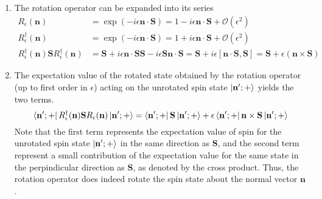 \begin{sol}
        \begin{enumerate}[label=\textbf{(\alph*)}]
            \item
            The rotation operator can be expanded into its series
            \begin{align}
                R_\epsilon(\mathbf{n})&=\exp\left(- i\epsilon\mathbf{n}\cdot\mathbf{S} \right)=1-i\epsilon\mathbf{n}\cdot\mathbf{S}+\mathcal{O}\left( \epsilon^2 \right)\\
                R_\epsilon^\dagger(\mathbf{n})&=\exp\left( -i\epsilon\mathbf{n}\cdot\mathbf{S} \right)=1+i\epsilon\mathbf{n}\cdot\mathbf{S}+\mathcal{O}\left( \epsilon^2 \right)\\
                R_\epsilon^\dagger(\mathbf{n})\mathbf{S}R_\epsilon^\dagger(\mathbf{n})&=\mathbf{S}+i\epsilon\mathbf{n\cdot S}\mathbf{S}-i\epsilon\mathbf{Sn\cdot S}=\mathbf{S}+i\epsilon[\mathbf{n\cdot S},\mathbf{S}]=\mathbf{S}+\epsilon(\mathbf{n}\times\mathbf{S})
            \end{align}
        \item
            The expectation value of the rotated state obtained by the rotation operator (up to first order in $\epsilon$) acting on the unrotated spin state $\ket{\mathbf{n'};+}$ yields the two terms.
            \begin{equation}
                \bra{\mathbf{n'};+}R_\epsilon^\dagger(\mathbf{n})\mathbf{S}R_\epsilon(\mathbf{n})\ket{\mathbf{n'};+} = \bra{\mathbf{n'};+}\mathbf{S}\ket{\mathbf{n'};+}+\epsilon\bra{\mathbf{n'};+}\mathbf{n}\times\mathbf{S}\ket{\mathbf{n'};+}
            \end{equation}
            Note that the first term represents the expectation value of spin for the unrotated spin state $\ket{\mathbf{n'};+}$ in the same direction as $\mathbf S$, and the second term represent a small contribution of the expectation value for the same state in the perpindicular direction as $\mathbf{S}$, as denoted by the cross product. Thus, the rotation operator does indeed rotate the spin state about the normal vector $\mathbf{n}$.
        \end{enumerate}
    \end{sol}    
